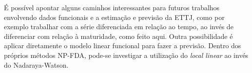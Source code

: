 \documentclass[
	12pt,				%
	openright,			%
	oneside,			%
	a4paper,			%
	english,			%
	brazil				%
	]{dissertacao-ufrgs-abntex2}
\begin{document}
É possível apontar alguns caminhos interessantes para futuros trabalhos envolvendo dados funcionais e a estimação e previsão da ETTJ, como por exemplo trabalhar com a série diferenciada em relação ao tempo, ao invés de diferenciar com relação à maturidade, como feito aqui. Outra possibilidade é aplicar diretamente o modelo linear funcional para fazer a previsão. Dentro dos próprios métodos NP-FDA, pode-se investigar a utilização do \emph{local linear} ao invés do Nadaraya-Watson.





%
%

\end{document}
